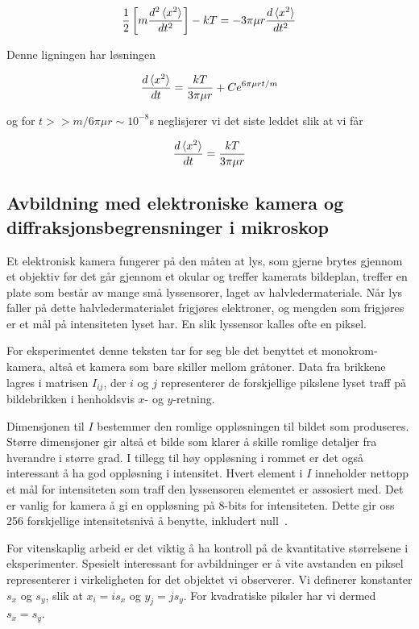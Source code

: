 \documentclass[a4paper,11pt, twocolumn]{article}
\begin{document}
\begin{equation}
	\frac{1}{2}\left[ m\frac{d^2\braket{x^2}}{dt^2}	 \right]-kT = -3\pi\mu r \frac{d\braket{x^2}}{dt^2}
	\label{:eq:ensamble}
\end{equation}

Denne ligningen har løsningen

\begin{equation}
	\frac{d\braket{x^2}}{dt}=\frac{kT}{3\pi\mu r}+Ce^{6\pi\mu r t/m}
	\label{eq:Langevin}
\end{equation}

og for $t>>m/6\pi\mu r\sim 10^{-8}$s neglisjerer vi det siste leddet slik at vi får 

\begin{equation}
	\frac{d\braket{x^2}}{dt}=\frac{kT}{3\pi\mu r}
	\label{eq:LangevinEnkel}
\end{equation}
\subsection{Avbildning med elektroniske kamera og diffraksjonsbegrensninger i mikroskop}
\label{sec:avbildning}
Et elektronisk kamera fungerer på den måten at lys, som gjerne brytes gjennom et objektiv før det går gjennom et okular og treffer kamerats bildeplan, treffer en plate som består av mange små lyssensorer, laget av halvledermateriale. Når lys faller på dette halvledermaterialet frigjøres elektroner, og mengden som frigjøres er et mål på intensiteten lyset har. En slik lyssensor kalles ofte en piksel. 

For eksperimentet denne teksten tar for seg ble det benyttet et monokrom-kamera, altså et kamera som bare skiller mellom gråtoner. Data fra brikkene lagres i matrisen $I_{ij}$, der $i$ og $j$ representerer de forskjellige pikslene lyset traff på bildebrikken i henholdsvis $x$- og $y$-retning.

Dimensjonen til $I$ bestemmer den romlige oppløsningen til bildet som produseres. Større dimensjoner gir altså et bilde som klarer å skille romlige detaljer fra hverandre i større grad. I tillegg til høy oppløsning i rommet er det også interessant å ha god oppløsning i intensitet. Hvert element i $I$ inneholder nettopp et mål for intensiteten som traff den lyssensoren elementet er assosiert med. Det er vanlig for kamera å gi en oppløsning på 8-bits for intensiteten. Dette gir oss 256 forskjellige intensitetsnivå å benytte, inkludert null~\cite{brownske}.

For vitenskaplig arbeid er det viktig å ha kontroll på de kvantitative størrelsene i eksperimenter. Spesielt interessant for avbildninger er å vite avstanden en piksel representerer i virkeligheten for det objektet vi observerer. Vi definerer konstanter $s_x$ og $s_y$, slik at $x_i= is_x$ og $y_j=js_y$. For kvadratiske piksler har vi dermed $s_x=s_y$.
\end{document}
